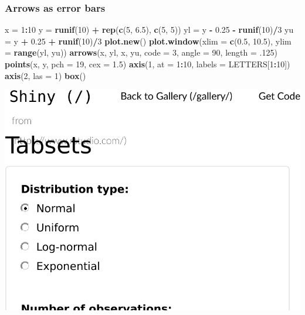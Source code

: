 \documentclass[]{book}
\newenvironment{Shaded}{\begin{snugshade}}{\end{snugshade}}
\newcommand{\KeywordTok}[1]{\textcolor[rgb]{0.13,0.29,0.53}{\textbf{#1}}}
\newcommand{\DataTypeTok}[1]{\textcolor[rgb]{0.13,0.29,0.53}{#1}}
\newcommand{\DecValTok}[1]{\textcolor[rgb]{0.00,0.00,0.81}{#1}}
\newcommand{\FloatTok}[1]{\textcolor[rgb]{0.00,0.00,0.81}{#1}}
\newcommand{\StringTok}[1]{\textcolor[rgb]{0.31,0.60,0.02}{#1}}
\newcommand{\OperatorTok}[1]{\textcolor[rgb]{0.81,0.36,0.00}{\textbf{#1}}}
\newcommand{\NormalTok}[1]{#1}
\theoremstyle{definition}
\theoremstyle{definition}
\theoremstyle{definition}
\theoremstyle{remark}
\begin{document}
\subsubsection{Arrows as error bars}\label{arrows-as-error-bars}

\begin{Shaded}
\begin{Highlighting}[]
\NormalTok{x =}\StringTok{ }\DecValTok{1}\OperatorTok{:}\DecValTok{10}
\NormalTok{y =}\StringTok{ }\KeywordTok{runif}\NormalTok{(}\DecValTok{10}\NormalTok{) }\OperatorTok{+}\StringTok{ }\KeywordTok{rep}\NormalTok{(}\KeywordTok{c}\NormalTok{(}\DecValTok{5}\NormalTok{, }\FloatTok{6.5}\NormalTok{), }\KeywordTok{c}\NormalTok{(}\DecValTok{5}\NormalTok{, }\DecValTok{5}\NormalTok{))}
\NormalTok{yl =}\StringTok{ }\NormalTok{y }\OperatorTok{-}\StringTok{ }\FloatTok{0.25} \OperatorTok{-}\StringTok{ }\KeywordTok{runif}\NormalTok{(}\DecValTok{10}\NormalTok{)}\OperatorTok{/}\DecValTok{3}
\NormalTok{yu =}\StringTok{ }\NormalTok{y }\OperatorTok{+}\StringTok{ }\FloatTok{0.25} \OperatorTok{+}\StringTok{ }\KeywordTok{runif}\NormalTok{(}\DecValTok{10}\NormalTok{)}\OperatorTok{/}\DecValTok{3}
\KeywordTok{plot.new}\NormalTok{()}
\KeywordTok{plot.window}\NormalTok{(}\DataTypeTok{xlim =} \KeywordTok{c}\NormalTok{(}\FloatTok{0.5}\NormalTok{, }\FloatTok{10.5}\NormalTok{), }\DataTypeTok{ylim =} \KeywordTok{range}\NormalTok{(yl, yu))}
\KeywordTok{arrows}\NormalTok{(x, yl, x, yu, }\DataTypeTok{code =} \DecValTok{3}\NormalTok{, }\DataTypeTok{angle =} \DecValTok{90}\NormalTok{, }\DataTypeTok{length =}\NormalTok{ .}\DecValTok{125}\NormalTok{)}
\KeywordTok{points}\NormalTok{(x, y, }\DataTypeTok{pch =} \DecValTok{19}\NormalTok{, }\DataTypeTok{cex =} \FloatTok{1.5}\NormalTok{)}
\KeywordTok{axis}\NormalTok{(}\DecValTok{1}\NormalTok{, }\DataTypeTok{at =} \DecValTok{1}\OperatorTok{:}\DecValTok{10}\NormalTok{, }\DataTypeTok{labels =}\NormalTok{ LETTERS[}\DecValTok{1}\OperatorTok{:}\DecValTok{10}\NormalTok{])}
\KeywordTok{axis}\NormalTok{(}\DecValTok{2}\NormalTok{, }\DataTypeTok{las =} \DecValTok{1}\NormalTok{)}
\KeywordTok{box}\NormalTok{()}
\end{Highlighting}
\end{Shaded}

\includegraphics[width=0.5\linewidth]{Rcourse_files/figure-latex/unnamed-chunk-259-1}
\end{document}
